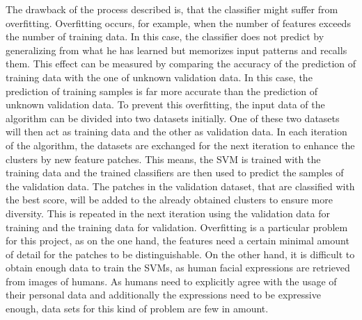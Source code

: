 The drawback of the process described is, that the classifier might suffer from overfitting. Overfitting occurs, for example, when the number of features exceeds the number of training data. In this case, the classifier does not predict by generalizing from what he has learned but memorizes input patterns and recalls them. This effect can be measured by comparing the accuracy of the prediction of training data with the one of unknown validation data. In this case, the prediction of training samples is far more accurate than the prediction of unknown validation data. To prevent this overfitting, the input data of the algorithm can be divided into two datasets initially. One of these two datasets will then act as training data and the other as validation data. In each iteration of the algorithm, the datasets are exchanged for the next iteration to enhance the clusters by new feature patches. This means, the SVM is trained with the training data and the trained classifiers are then used to predict the samples of the validation data. The patches in the validation dataset, that are classified with the best score, will be added to the already obtained clusters to ensure more diversity. This is repeated in the next iteration using the validation data for training and the training data for validation. Overfitting is a particular problem for this project, as on the one hand, the features need a certain minimal amount of detail for the patches to be distinguishable. On the other hand, it is difficult to obtain enough data to train the SVMs, as human facial expressions are retrieved from images of humans. As humans need to explicitly agree 
with the usage of their personal data and additionally the expressions need to be expressive enough, data sets for this kind of problem are few in amount.
